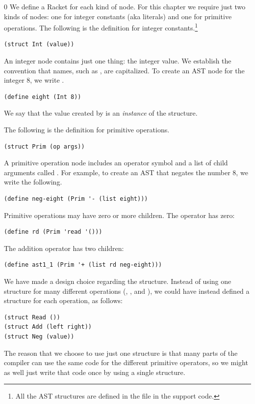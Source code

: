 \documentclass[7x10]{TimesAPriori_MIT}%
\def\racketEd{0}
\def\edition{1}
\numberwithin{theorem}{chapter}
\numberwithin{definition}{chapter}
\numberwithin{equation}{chapter}
\begin{document}
{\if\edition\racketEd
We define a Racket  for each kind of node.  For this
chapter we require just two kinds of nodes: one for integer constants
(aka literals)
and one for primitive operations.  The following is the 
definition for integer constants.\footnote{All the AST structures are
defined in the file  in the support code.}
\begin{lstlisting}
(struct Int (value))
\end{lstlisting}
An integer node contains just one thing: the integer value.
We establish the convention that  names, such
as , are capitalized.
To create an AST node for the integer $8$, we write .
\begin{lstlisting}
(define eight (Int 8))
\end{lstlisting}
We say that the value created by  is an
\emph{instance} of the
 structure.

The following is the  definition for primitive operations.
\begin{lstlisting}
(struct Prim (op args))
\end{lstlisting}
A primitive operation node includes an operator symbol  and a
list of child arguments called . For example, to create an
AST that negates the number $8$, we write the following.
\begin{lstlisting}
(define neg-eight (Prim '- (list eight)))
\end{lstlisting}
Primitive operations may have zero or more children. The 
operator has zero:
\begin{lstlisting}
(define rd (Prim 'read '()))
\end{lstlisting}
The addition operator has two children:
\begin{lstlisting}
(define ast1_1 (Prim '+ (list rd neg-eight)))
\end{lstlisting}

We have made a design choice regarding the  structure.
Instead of using one structure for many different operations
(, \code{+}, and \code{-}), we could have instead defined a
structure for each operation, as follows:
\begin{lstlisting}
(struct Read ())
(struct Add (left right))
(struct Neg (value))
\end{lstlisting}
The reason that we choose to use just one structure is that many parts
of the compiler can use the same code for the different primitive
operators, so we might as well just write that code once by using a
single structure.
%
\fi}
\end{document}
